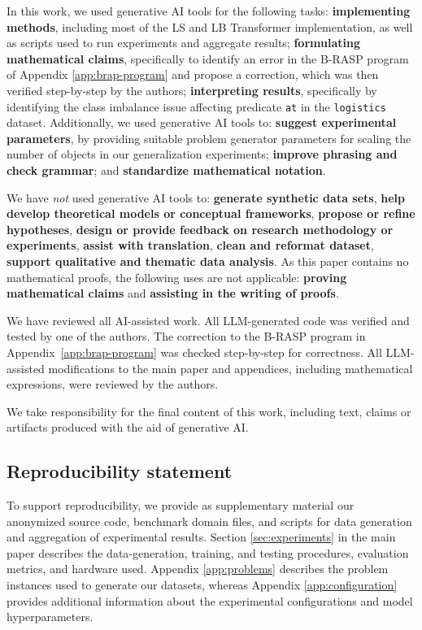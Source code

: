 \documentclass{article} %
\theoremstyle{definition}
\newcommand{\lgt}{\texttt{logistics}\xspace}
\begin{document}
In this work, we used generative AI tools for the following tasks:
\textbf{implementing methods}, including most of the LS and LB Transformer implementation, as well as scripts used to run experiments and aggregate results;
\textbf{formulating mathematical claims}, specifically to identify an error in the B-RASP program of Appendix \ref{app:brap-program} and propose a correction, which was then verified step-by-step by the authors;
\textbf{interpreting results}, specifically by identifying the class imbalance issue affecting predicate \texttt{at} in the \lgt dataset.
Additionally, we used generative AI tools to:
\textbf{suggest experimental parameters}, by providing suitable problem generator parameters for scaling the number of objects in our generalization experiments;
\textbf{improve phrasing and check grammar}; and
\textbf{standardize mathematical notation}.

We have \textit{not} used generative AI tools to: \textbf{generate synthetic data sets},\textbf{ help develop theoretical models or conceptual frameworks}, \textbf{propose or refine hypotheses}, \textbf{design or provide feedback on research methodology or experiments}, \textbf{assist with translation}, \textbf{clean and reformat dataset}, \textbf{support qualitative and thematic data analysis}.
As this paper contains no mathematical proofs, the following uses are not applicable: \textbf{proving mathematical claims} and \textbf{assisting in the writing of proofs}.

We have reviewed all AI-assisted work.
All LLM-generated code was verified and tested by one of the authors.
The correction to the B-RASP program in Appendix~\ref{app:brap-program} was checked step-by-step for correctness.
All LLM-assisted modifications to the main paper and appendices, including mathematical expressions, were reviewed by the authors.

We take responsibility for the final content of this work, including text, claims or artifacts produced with the aid of generative AI.
 

\subsection*{Reproducibility statement}

To support reproducibility, we provide as supplementary material our anonymized source code, benchmark domain files, and scripts for data generation and aggregation of experimental results.
Section \ref{sec:experiments} in the main paper describes the data-generation, training, and testing procedures, evaluation metrics, and hardware used. 
Appendix \ref{app:problems} describes the problem instances used to generate our datasets,
whereas Appendix \ref{app:configuration} provides additional information about the experimental configurations and model hyperparameters.
\end{document}

